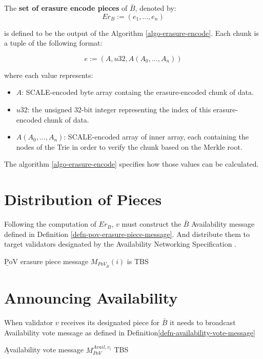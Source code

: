 \begin{definition}
  \label{defn-erasure-coded-pieces}
  The {\bf set of erasure encode pieces} of $\bar{B}$, denoted by:
  \[
   Er_B := (e_1,...,e_n)
  \]

  is defined to be the output of the Algorithm \ref{algo-erasure-encode}.
  Each chunk is a tuple of the following format:

  \[
    e := (A, u32, A(A_0,...,A_n))
  \]

  where each value represents:
  \begin{itemize}
    \item $A$: SCALE-encoded byte array containg the erasure-encoded chunk of data.
    \item $u32$: the unsigned 32-bit integer representing the index of this
    erasure-encoded chunk of data.
    \item $A(A_0,...,A_n)$: SCALE-encoded array of inner array, each containing
    the nodes of the Trie in order to verify the chunk based on the Merkle root.
  \end{itemize}

  The algorithm \ref{algo-erasure-encode} specifies how those values can be
  calculated.
\end{definition}

\section{Distribution of Pieces}\label{sect-distribute-pieces} Following the
computation of $Er_B$, $v$ must construct the $\bar{B}$ Availability message
defined in Definition \ref{defn-pov-erasure-piece-message}. And distribute them
to target validators designated by the Availability Networking Specification
\cite{??}.

\begin{definition}
  \label{defn-pov-erasure-piece-message}
        {\b PoV erasure piece message} $M_{PoV_{\bar{B}}}(i)$ is TBS
\end{definition}

\section{Announcing Availability}\label{sect-voting-on-availability}

When validator $v$ receives its designated piece for $\bar{B}$ it needs to
broadcast Availability vote message as defined in
Definition\ref{defn-availability-vote-message}
\begin{definition}
  \label{defn-availability-vote-message}
        {\b Availability vote message} $M_{PoV}^{Avail,v_i}$ TBS
\end{definition}

